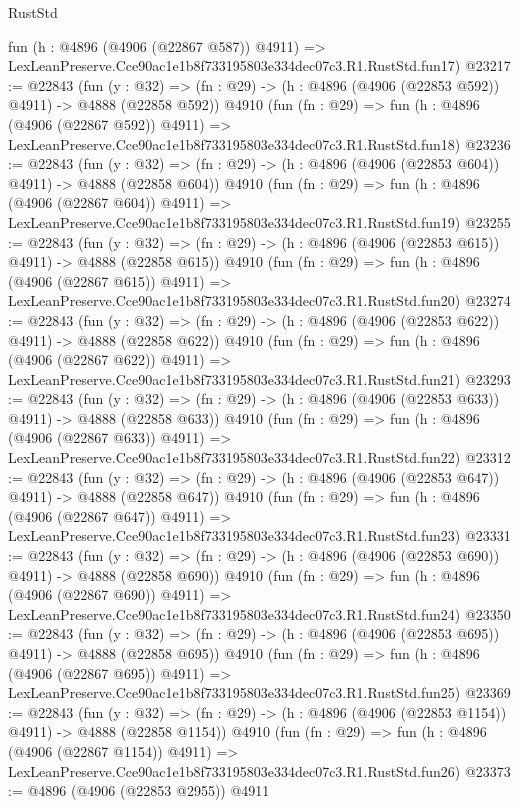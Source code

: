 \begin{lexlean}{RustStd}
\begin{coremodule}
    fun (h : @4896 (@4906 (@22867 @587)) @4911) =>
    LexLeanPreserve.Cce90ac1e1b8f733195803e334dec07c3.R1.RustStd.fun17)
@23217 := @22843
    (fun (y : @32) => (fn : @29) -> (h : @4896 (@4906 (@22853 @592)) @4911) -> @4888 (@22858 @592))
    @4910
    (fun (fn : @29) =>
    fun (h : @4896 (@4906 (@22867 @592)) @4911) =>
    LexLeanPreserve.Cce90ac1e1b8f733195803e334dec07c3.R1.RustStd.fun18)
@23236 := @22843
    (fun (y : @32) => (fn : @29) -> (h : @4896 (@4906 (@22853 @604)) @4911) -> @4888 (@22858 @604))
    @4910
    (fun (fn : @29) =>
    fun (h : @4896 (@4906 (@22867 @604)) @4911) =>
    LexLeanPreserve.Cce90ac1e1b8f733195803e334dec07c3.R1.RustStd.fun19)
@23255 := @22843
    (fun (y : @32) => (fn : @29) -> (h : @4896 (@4906 (@22853 @615)) @4911) -> @4888 (@22858 @615))
    @4910
    (fun (fn : @29) =>
    fun (h : @4896 (@4906 (@22867 @615)) @4911) =>
    LexLeanPreserve.Cce90ac1e1b8f733195803e334dec07c3.R1.RustStd.fun20)
@23274 := @22843
    (fun (y : @32) => (fn : @29) -> (h : @4896 (@4906 (@22853 @622)) @4911) -> @4888 (@22858 @622))
    @4910
    (fun (fn : @29) =>
    fun (h : @4896 (@4906 (@22867 @622)) @4911) =>
    LexLeanPreserve.Cce90ac1e1b8f733195803e334dec07c3.R1.RustStd.fun21)
@23293 := @22843
    (fun (y : @32) => (fn : @29) -> (h : @4896 (@4906 (@22853 @633)) @4911) -> @4888 (@22858 @633))
    @4910
    (fun (fn : @29) =>
    fun (h : @4896 (@4906 (@22867 @633)) @4911) =>
    LexLeanPreserve.Cce90ac1e1b8f733195803e334dec07c3.R1.RustStd.fun22)
@23312 := @22843
    (fun (y : @32) => (fn : @29) -> (h : @4896 (@4906 (@22853 @647)) @4911) -> @4888 (@22858 @647))
    @4910
    (fun (fn : @29) =>
    fun (h : @4896 (@4906 (@22867 @647)) @4911) =>
    LexLeanPreserve.Cce90ac1e1b8f733195803e334dec07c3.R1.RustStd.fun23)
@23331 := @22843
    (fun (y : @32) => (fn : @29) -> (h : @4896 (@4906 (@22853 @690)) @4911) -> @4888 (@22858 @690))
    @4910
    (fun (fn : @29) =>
    fun (h : @4896 (@4906 (@22867 @690)) @4911) =>
    LexLeanPreserve.Cce90ac1e1b8f733195803e334dec07c3.R1.RustStd.fun24)
@23350 := @22843
    (fun (y : @32) => (fn : @29) -> (h : @4896 (@4906 (@22853 @695)) @4911) -> @4888 (@22858 @695))
    @4910
    (fun (fn : @29) =>
    fun (h : @4896 (@4906 (@22867 @695)) @4911) =>
    LexLeanPreserve.Cce90ac1e1b8f733195803e334dec07c3.R1.RustStd.fun25)
@23369 := @22843
    (fun (y : @32) =>
    (fn : @29) -> (h : @4896 (@4906 (@22853 @1154)) @4911) -> @4888 (@22858 @1154))
    @4910
    (fun (fn : @29) =>
    fun (h : @4896 (@4906 (@22867 @1154)) @4911) =>
    LexLeanPreserve.Cce90ac1e1b8f733195803e334dec07c3.R1.RustStd.fun26)
@23373 := @4896 (@4906 (@22853 @2955)) @4911

\end{coremodule}
\end{lexlean}
